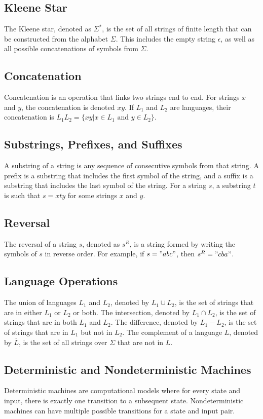 \documentclass[hidelinks,12pt]{article}
\begin{document}
\subsection{Kleene Star}
The Kleene star, denoted as $\Sigma^*$, is the set of all strings of finite
length that can be constructed from the alphabet $\Sigma$. This includes the
empty string $\epsilon$, as well as all possible concatenations of symbols from
$\Sigma$.

\subsection{Concatenation}
Concatenation is an operation that links two strings end to end. For strings
$x$ and $y$, the concatenation is denoted $xy$. If $L_1$ and $L_2$ are
languages, their concatenation is $L_1L_2 = \{xy | x \in L_1 \text{ and } y \in
L_2\}$.

\subsection{Substrings, Prefixes, and Suffixes}
A substring of a string is any sequence of consecutive symbols from that
string. A prefix is a substring that includes the first symbol of the string,
and a suffix is a substring that includes the last symbol of the string. For a
string $s$, a substring $t$ is such that $s = xty$ for some strings $x$ and
$y$.

\subsection{Reversal}
The reversal of a string $s$, denoted as $s^R$, is a string formed by writing
the symbols of $s$ in reverse order. For example, if $s = "abc"$, then $s^R =
"cba"$.


\subsection{Language Operations}
The union of languages $L_1$ and $L_2$, denoted by $L_1 \cup L_2$, is the set
of strings that are in either $L_1$ or $L_2$ or both. The intersection, denoted
by $L_1 \cap L_2$, is the set of strings that are in both $L_1$ and $L_2$. The
difference, denoted by $L_1 - L_2$, is the set of strings that are in $L_1$ but
not in $L_2$. The complement of a language $L$, denoted by $\overline{L}$, is
the set of all strings over $\Sigma$ that are not in $L$.

\subsection{Deterministic and Nondeterministic Machines}
Deterministic machines are computational models where for every state and
input, there is exactly one transition to a subsequent state. Nondeterministic
machines can have multiple possible transitions for a state and input pair.
\end{document}
